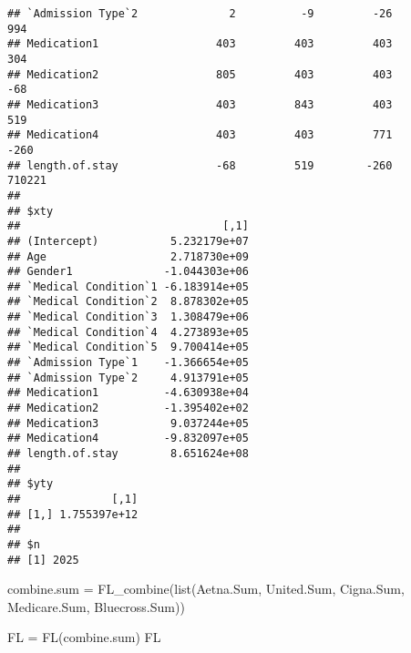 \documentclass[
]{article}
\newenvironment{Shaded}{\begin{snugshade}}{\end{snugshade}}
\newcommand{\FunctionTok}[1]{\textcolor[rgb]{0.00,0.00,0.00}{#1}}
\newcommand{\NormalTok}[1]{#1}
\newcommand{\OtherTok}[1]{\textcolor[rgb]{0.56,0.35,0.01}{#1}}
\begin{document}
\begin{verbatim}
## `Admission Type`2              2          -9         -26            994
## Medication1                  403         403         403            304
## Medication2                  805         403         403            -68
## Medication3                  403         843         403            519
## Medication4                  403         403         771           -260
## length.of.stay               -68         519        -260         710221
## 
## $xty
##                               [,1]
## (Intercept)           5.232179e+07
## Age                   2.718730e+09
## Gender1              -1.044303e+06
## `Medical Condition`1 -6.183914e+05
## `Medical Condition`2  8.878302e+05
## `Medical Condition`3  1.308479e+06
## `Medical Condition`4  4.273893e+05
## `Medical Condition`5  9.700414e+05
## `Admission Type`1    -1.366654e+05
## `Admission Type`2     4.913791e+05
## Medication1          -4.630938e+04
## Medication2          -1.395402e+02
## Medication3           9.037244e+05
## Medication4          -9.832097e+05
## length.of.stay        8.651624e+08
## 
## $yty
##              [,1]
## [1,] 1.755397e+12
## 
## $n
## [1] 2025
\end{verbatim}

\begin{Shaded}
\begin{Highlighting}[]
\NormalTok{combine.sum }\OtherTok{=} \FunctionTok{FL\_combine}\NormalTok{(}\FunctionTok{list}\NormalTok{(Aetna.Sum, United.Sum, Cigna.Sum, Medicare.Sum, Bluecross.Sum))}

\NormalTok{FL }\OtherTok{=} \FunctionTok{FL}\NormalTok{(combine.sum)}
\NormalTok{FL}
\end{Highlighting}
\end{Shaded}
\end{document}
